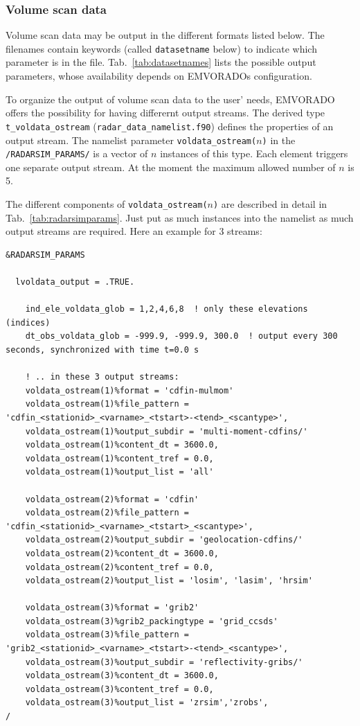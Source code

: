 \documentclass[10pt,a4paper,twoside,headinclude,footinclude,parskip=half]{scrartcl}
\newcommand{\myaktuellesection}{sec:intro}%
\newcommand{\labelsec}[1]{\label{#1}\renewcommand{\myaktuellesection}{#1}}%
\newcommand{\labelsec}[1]{\label{#1}}%
\newcommand{\srcform}[1]{\mbox{\texttt{#1}}\xspace}%
\newcommand{\paramform}[1]{\mbox{\texttt{#1}}\xspace}%
\begin{document}
\subsubsection{Volume scan data}
\labelsec{sec:output:format:vol}

Volume scan data may be output in the different formats listed below. The filenames
contain keywords (called \srcform{datasetname} below) to indicate which parameter is in the file. Tab.~\ref{tab:datasetnames} lists the possible output parameters, whose availability
depends on EMVORADOs configuration.

To organize the output of volume scan data to the user' needs, EMVORADO offers the possibility for having differernt output streams.
The derived type \paramform{t_voldata_ostream} (\srcform{radar_data_namelist.f90}) defines the properties of an output stream.
The namelist parameter \paramform{voldata_ostream($n$)} in the \paramform{/RADARSIM_PARAMS/} is a vector of $n$ instances of this type.
Each element triggers one separate output stream. At the moment the maximum allowed number of $n$ is 5.

The different components of \paramform{voldata_ostream($n$)} are described in detail in Tab.~\ref{tab:radarsimparams}.
Just put as much instances into the namelist as much output streams are required. Here an example for 3 streams:
\begin{verbatim}
&RADARSIM_PARAMS

  lvoldata_output = .TRUE.

    ind_ele_voldata_glob = 1,2,4,6,8  ! only these elevations (indices)
    dt_obs_voldata_glob = -999.9, -999.9, 300.0  ! output every 300 seconds, synchronized with time t=0.0 s

    ! .. in these 3 output streams:
    voldata_ostream(1)%format = 'cdfin-mulmom'
    voldata_ostream(1)%file_pattern = 'cdfin_<stationid>_<varname>_<tstart>-<tend>_<scantype>',
    voldata_ostream(1)%output_subdir = 'multi-moment-cdfins/'
    voldata_ostream(1)%content_dt = 3600.0,
    voldata_ostream(1)%content_tref = 0.0,
    voldata_ostream(1)%output_list = 'all'
    
    voldata_ostream(2)%format = 'cdfin'
    voldata_ostream(2)%file_pattern = 'cdfin_<stationid>_<varname>_<tstart>_<scantype>',
    voldata_ostream(2)%output_subdir = 'geolocation-cdfins/'
    voldata_ostream(2)%content_dt = 3600.0,
    voldata_ostream(2)%content_tref = 0.0,
    voldata_ostream(2)%output_list = 'losim', 'lasim', 'hrsim'
    
    voldata_ostream(3)%format = 'grib2'
    voldata_ostream(3)%grib2_packingtype = 'grid_ccsds'
    voldata_ostream(3)%file_pattern = 'grib2_<stationid>_<varname>_<tstart>-<tend>_<scantype>',
    voldata_ostream(3)%output_subdir = 'reflectivity-gribs/'
    voldata_ostream(3)%content_dt = 3600.0,
    voldata_ostream(3)%content_tref = 0.0,
    voldata_ostream(3)%output_list = 'zrsim','zrobs',
/
\end{verbatim}
\end{document}
